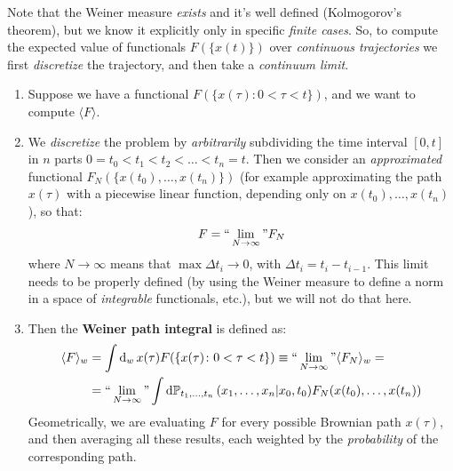 \documentclass[../template.tex]{subfiles}
\begin{document}
Note that the Weiner measure \textit{exists} and it's well defined (Kolmogorov's theorem), but we know it explicitly only in specific \textit{finite cases}. So, to compute the expected value of functionals $F(\{x(t)\})$ over \textit{continuous trajectories} we first \textit{discretize} the trajectory, and then take a \textit{continuum limit}. 
\begin{enumerate}
    \item Suppose we have a functional $F(\{x(\tau)\colon 0< \tau < t\})$, and we want to compute $\langle F \rangle$.
    \item We \textit{discretize} the problem by \textit{arbitrarily}  subdividing the time interval $[0,t]$  in $n$ parts $0 = t_0 < t_1 < t_2 < \dots < t_n  = t$. Then we consider an \textit{approximated} functional $F_N(\{x(t_0), \dots, x(t_n)\})$ (for example approximating the path $x(\tau)$ with a piecewise linear function, depending only on $x(t_0),\dots,x(t_{n})$), so that:
    \begin{align*}
        F = ``\lim_{N \to \infty}" F_N
    \end{align*}
    where $N \to\infty $ means that $\max \Delta t_i \to 0$, with $\Delta t_i = t_i - t_{i-1}$. This limit needs to be properly defined (by using the Weiner measure to define a norm in a space of \textit{integrable} functionals, etc.), but we will not do that here.
    \item Then the \textbf{Weiner path integral} is defined as:
    \begin{align*}
        \langle F \rangle_w &= \int \dd{_w}x(\tau) F(\{x(\tau)\colon 0 < \tau< t \}) \equiv ``\lim_{N \to \infty}" \langle F_N \rangle_w =\\
        &= ``\lim_{N \to \infty}" \int \dd{\mathbb{P}}_{t_1,\dots,t_n}(x_1,\dots,x_n|x_0,t_0) F_N(x(t_0), \dots, x(t_{n}))
    \end{align*} 
    Geometrically, we are evaluating $F$ for every possible Brownian path $x(\tau)$, and then averaging all these results, each weighted by the \textit{probability} of the corresponding path.    
\end{enumerate}
\end{document}
